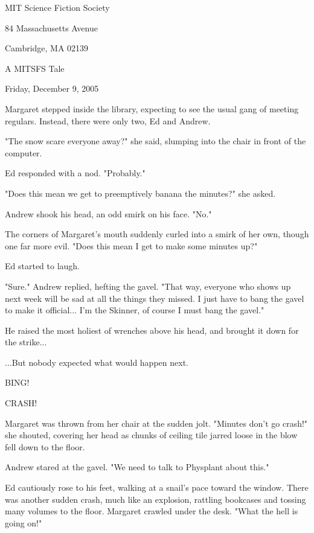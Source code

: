 \documentclass[10pt]{article}
\begin{document}
\begin{center}

MIT Science Fiction Society 

84 Massachusetts Avenue

Cambridge, MA 02139

\vspace{12pt}

A MITSFS Tale 

Friday, December 9, 2005

\end{center}
 
\vspace{18pt}

\setlength{\parskip}{6pt}

Margaret stepped inside the library, expecting to see the usual gang of meeting regulars. Instead, there were only two, Ed and Andrew.

"The snow scare everyone away?" she said, slumping into the chair in front of the computer.

Ed responded with a nod. "Probably."

"Does this mean we get to preemptively banana the minutes?" she asked.

Andrew shook his head, an odd smirk on his face. "No."

The corners of Margaret's mouth suddenly curled into a smirk of her own, though one far more evil. "Does this mean I get to make some minutes up?"

Ed started to laugh.

"Sure." Andrew replied, hefting the gavel. "That way, everyone who shows up next week will be sad at all the things they missed. I just have to bang the gavel to make it official... I'm the Skinner, of course I must bang the gavel."

He raised the most holiest of wrenches above his head, and brought it down for the strike...

...But nobody expected what would happen next.

BING!

CRASH!

Margaret was thrown from her chair at the sudden jolt. "Minutes don't go crash!" she shouted, covering her head as chunks of ceiling tile jarred loose in the blow fell down to the floor.

Andrew stared at the gavel. "We need to talk to Physplant about this."

Ed cautiously rose to his feet, walking at a snail's pace toward the window. There was another sudden crash, much like an explosion, rattling bookcases and tossing many volumes to the floor. Margaret crawled under the desk. "What the hell is going on!"
\end{document}
